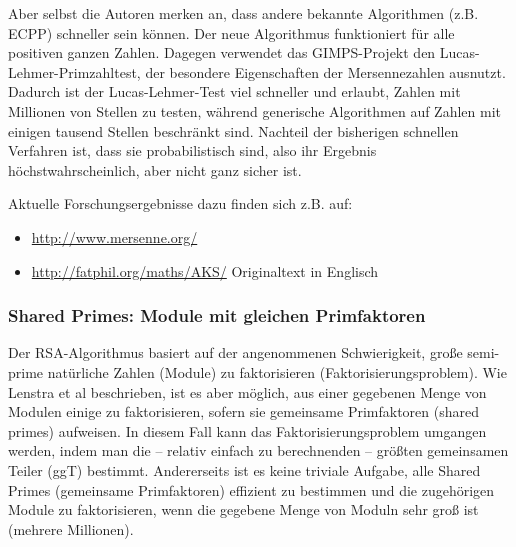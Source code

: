 \begin{refsegment}
Aber selbst die Autoren merken an, dass andere bekannte Algorithmen (z.B. ECPP) schneller sein können. Der neue Algorithmus funktioniert für alle positiven ganzen Zahlen. Dagegen verwendet das GIMPS-Projekt den Lucas-Lehmer-Primzahltest, der besondere Eigenschaften der Mersennezahlen ausnutzt. Dadurch ist der Lucas-Lehmer-Test viel schneller und erlaubt, Zahlen mit Millionen von Stellen zu testen, während generische Algorithmen auf Zahlen mit einigen tausend Stellen beschränkt sind. Nachteil der bisherigen schnellen Verfahren ist, dass sie probabilistisch sind, also ihr Ergebnis höchstwahrscheinlich, aber nicht ganz sicher ist.

Aktuelle Forschungsergebnisse dazu finden sich z.B. auf:
\begin{itemize}[nosep,label=-]
\item \url{http://www.mersenne.org/}
\item \url{http://fatphil.org/maths/AKS/} Originaltext in Englisch
\end{itemize}



\subsubsection{\glqq Shared Primes\grqq: Module mit gleichen Primfaktoren}
\label{nt_Shared-Primes} 

Der RSA-Algorithmus basiert auf der angenommenen Schwierigkeit, große semi-prime
natürliche Zahlen (Module) zu faktorisieren (Faktorisierungsproblem).
Wie Lenstra et al \cite{Lenstra2012} beschrieben, ist es aber möglich, aus
einer gegebenen Menge von Modulen einige zu faktorisieren, sofern sie
gemeinsame Primfaktoren (shared primes) aufweisen. In diesem Fall kann das
Faktorisierungsproblem umgangen werden, indem man die -- relativ einfach zu
berechnenden -- größten gemeinsamen Teiler (ggT) bestimmt. Andererseits ist es
keine triviale Aufgabe, alle Shared Primes (gemeinsame Primfaktoren) effizient
zu bestimmen und die zugehörigen Module zu faktorisieren, wenn die gegebene
Menge von Moduln sehr groß ist (mehrere Millionen).


\end{refsegment}
